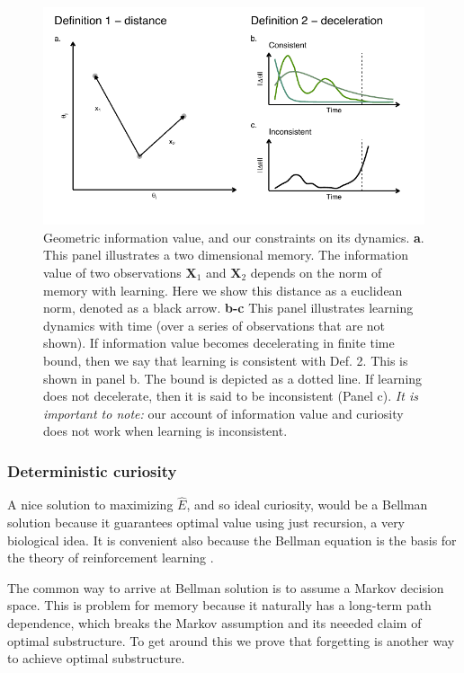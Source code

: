 \begin{figure}
	\begin{fullwidth}
	\includegraphics[width=0.7\linewidth]{img/cartoon.pdf} 
	\caption{Geometric information value, and our constraints on its dynamics. 
	\textbf{a}. This panel illustrates a two dimensional memory. The information value of two observations $\mathbf{X}_1$ and $\mathbf{X}_2$ depends on the norm of memory with learning. Here we show this distance as a euclidean norm, denoted as a black arrow.
	\textbf{b-c} This panel illustrates learning dynamics with time (over a series of observations that are not shown). If information value becomes decelerating in finite time bound, then we say that learning is consistent with Def. 2. This is shown in panel b. The bound is depicted as a dotted line. If learning does not decelerate, then it is said to be inconsistent (Panel c). \textit{It is important to note:} our account of information value and curiosity does not work when learning is inconsistent.
  	}
	\label{fig:cartoon} 
	\end{fullwidth}
\end{figure}

\subsubsection{Deterministic curiosity}
A nice solution to maximizing $\hat E$, and so ideal curiosity, would be a Bellman solution \citep{Bellmann1954} because it guarantees optimal value using just recursion, a very biological idea. It is convenient also because the Bellman equation is the basis for the theory of reinforcement learning \citep{Sutton2018}. 

The common way to arrive at Bellman solution is to assume a Markov decision space. This is problem for memory because it naturally has a long-term path dependence, which breaks the Markov assumption and its neeeded claim of optimal substructure. To get around this we prove that forgetting is another way to achieve optimal substructure. 

